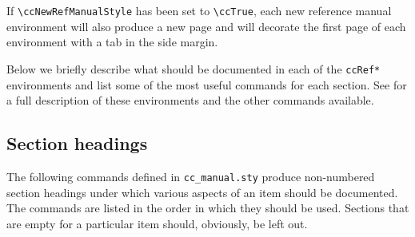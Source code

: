 If \verb|\ccNewRefManualStyle|%
 has been set to \verb|\ccTrue|, each
new reference manual environment will also produce a new page and will
decorate the first page of each environment with a tab in the side
margin.  

Below we briefly describe what should be documented in
each of the {\tt ccRef*} environments and list some of the most useful
commands for each section.  See 
for a full description of these environments and the other commands
available.

\subsection{Section headings}
\label{sec:section_headings}

The following commands defined in {\tt cc\_manual.sty} produce non-numbered
section headings under which various aspects of an item should be documented.  
The commands are listed in the order in which they should be used.  Sections
that are empty for a particular item should, obviously, be left out. 

